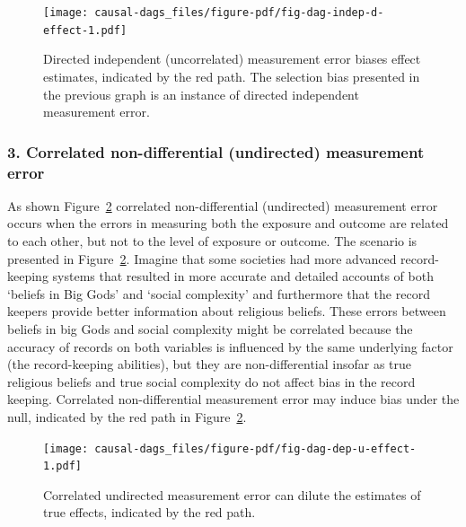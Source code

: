 \documentclass[
  singlecolumn]{report}
\begin{document}
\begin{figure}

{\centering \texttt{[image: causal-dags\_files/figure-pdf/fig-dag-indep-d-effect-1.pdf]}

}

\caption{\label{fig-dag-indep-d-effect}Directed independent
(uncorrelated) measurement error biases effect estimates, indicated by
the red path. The selection bias presented in the previous graph is an
instance of directed independent measurement error.}

\end{figure}

\hypertarget{correlated-non-differential-undirected-measurement-error}{%
\subsubsection{\texorpdfstring{3. \textbf{Correlated non-differential
(undirected) measurement
error}}{3. Correlated non-differential (undirected) measurement error}}\label{correlated-non-differential-undirected-measurement-error}}

As shown Figure~\ref{fig-dag-dep-u-effect} correlated non-differential
(undirected) measurement error occurs when the errors in measuring both
the exposure and outcome are related to each other, but not to the level
of exposure or outcome. The scenario is presented in
Figure~\ref{fig-dag-dep-u-effect}. Imagine that some societies had more
advanced record-keeping systems that resulted in more accurate and
detailed accounts of both `beliefs in Big Gods' and `social complexity'
and furthermore that the record keepers provide better information about
religious beliefs. These errors between beliefs in big Gods and social
complexity might be correlated because the accuracy of records on both
variables is influenced by the same underlying factor (the
record-keeping abilities), but they are non-differential insofar as true
religious beliefs and true social complexity do not affect bias in the
record keeping. Correlated non-differential measurement error may induce
bias under the null, indicated by the red path in
Figure~\ref{fig-dag-dep-u-effect}.

\begin{figure}

{\centering \texttt{[image: causal-dags\_files/figure-pdf/fig-dag-dep-u-effect-1.pdf]}

}

\caption{\label{fig-dag-dep-u-effect}Correlated undirected measurement
error can dilute the estimates of true effects, indicated by the red
path.}

\end{figure}
\end{document}
